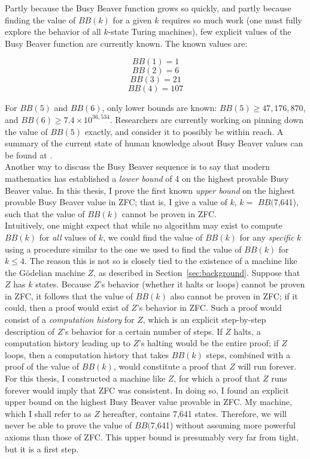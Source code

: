 \documentclass[11pt]{article}
\newcommand{\statenum}{7,641 }
\newcommand{\bbstatenum}{$BB($7,641) }
\newcommand{\bbstatenumcomma}{$BB($7,641), }
\begin{document}
Partly because the Busy Beaver function grows so quickly, and partly because finding the value of $BB(k)$ for a given $k$ requires so much work (one must fully explore the behavior of all $k$-state Turing machines), few explicit values of the Busy Beaver function are currently known. The known values are: 

$$BB(1) = 1$$
$$BB(2) = 6$$
$$BB(3) = 21$$
$$BB(4) = 107$$

For $BB(5)$ and $BB(6)$, only lower bounds are known: $BB(5) \ge 47,176,870$, and $BB(6) \ge 7.4 \times 10^{36,534}$. Researchers are currently working on pinning down the value of $BB(5)$ exactly, and consider it to possibly be within reach. A summary of the current state of human knowledge about Busy Beaver values can be found at \cite{bbvalues}.\\


Another way to discuss the Busy Beaver sequence is to say that modern mathematics has established a \emph{lower bound} of 4 on the highest provable Busy Beaver value. In this thesis, I prove the first known \emph{upper bound} on the highest provable Busy Beaver value in ZFC; that is, I give a value of $k$, $k=$ \bbstatenumcomma such that the value of $BB(k)$ cannot be proven in ZFC. \\

Intuitively, one might expect that while no algorithm may exist to compute $BB(k)$ for \emph{all} values of $k$, we could find the value of $BB(k)$ for any \emph{specific} $k$ using a procedure similar to the one we used to find the value of $BB(k)$ for $k \le 4$. The reason this is not so is closely tied to the existence of a machine like the G\"{o}delian machine $Z$, as described in Section~\ref{sec:background}. Suppose that $Z$ has $k$ states. Because $Z$'s behavior (whether it halts or loops) cannot be proven in ZFC, it follows that the value of $BB(k)$ also cannot be proven in ZFC; if it could, then a proof would exist of $Z$'s behavior in ZFC. Such a proof would consist of a \emph{computation history} for $Z$, which is an explicit step-by-step description of $Z$'s behavior for a certain number of steps. If $Z$ halts, a computation history leading up to $Z$'s halting would be the entire proof; if $Z$ loops, then a computation history that takes $BB(k)$ steps, combined with a proof of the value of $BB(k)$, would constitute a proof that $Z$ will run forever. \\

For this thesis, I constructed a machine like $Z$, for which a proof that $Z$ runs forever would imply that ZFC was consistent. In doing so, I found an explicit upper bound on the highest Busy Beaver value provable in ZFC. My machine, which I shall refer to as $Z$ hereafter, contains \statenum states. Therefore, we will never be able to prove the value of \bbstatenum without assuming more powerful axioms than those of ZFC. This upper bound is presumably very far from tight, but it is a first step.
\end{document}
